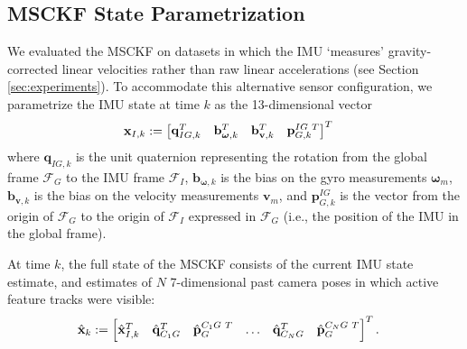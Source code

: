 \documentclass[letterpaper, 10 pt, conference]{ieeeconf}  %
\def\Vec#1{\mathbf{#1}}
\newcommand{\bbm}{\begin{bmatrix}}
\newcommand{\ebm}{\end{bmatrix}}
\begin{document}
\subsection{MSCKF State Parametrization} \label{sec:state_parametrization}
We evaluated the MSCKF on datasets in which the IMU `measures' gravity-corrected linear velocities rather than raw linear accelerations (see Section \ref{sec:experiments}).
To accommodate this alternative sensor configuration, we parametrize the IMU state at time $k$ as the 13-dimensional vector
\begin{align}
    \Vec{x}_{I,k} &:= \bbm \Vec{q}_{IG,k}^T & \Vec{b}_{\boldsymbol{\omega},k}^T & \Vec{b}_{\Vec{v},k}^T & \Vec{p}_{G,k}^{IG \hspace{0.3em} T} \ebm^T
\end{align}
where $\Vec{q}_{IG,k}$ is the unit quaternion representing the rotation from the global frame $\mathcal{F}_G$ to the IMU frame $\mathcal{F}_I$, $\Vec{b}_{\boldsymbol{\omega},k}$ is the bias on the gyro measurements $\boldsymbol{\omega}_m$, $\Vec{b}_{\Vec{v},k}$ is the bias on the velocity measurements $\Vec{v}_m$, and $\Vec{p}_{G,k}^{IG}$ is the vector from the origin of $\mathcal{F}_G$ to the origin of $\mathcal{F}_I$ expressed in $\mathcal{F}_G$ (i.e., the position of the IMU in the global frame).

At time $k$, the full state of the MSCKF consists of the current IMU state estimate, and estimates of $N$ 7-dimensional past camera poses in which active feature tracks were visible:
\begin{align*}
    \hat{\Vec{x}}_k &:= \bbm \hat{\Vec{x}}_{I,k}^T & \hat{\Vec{q}}_{C_1 G}^T & \hat{\Vec{p}}_G^{C_1 G \hspace{0.3em} T} & \hdots & \hat{\Vec{q}}_{C_N G}^T & \hat{\Vec{p}}_G^{C_N G \hspace{0.3em} T} \ebm ^T.
\end{align*}
\end{document}
